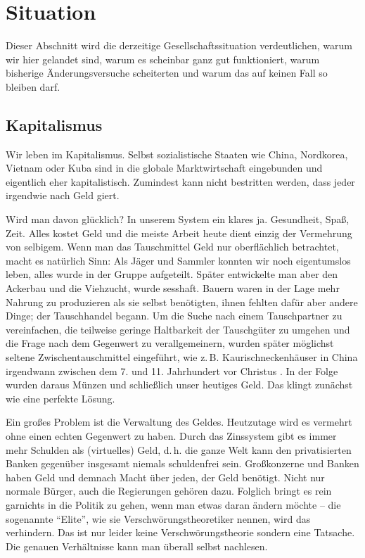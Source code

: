 \section{Situation}\label{sec:situation}

Dieser Abschnitt wird die derzeitige Gesellschaftssituation verdeutlichen, warum wir hier gelandet sind, warum es scheinbar ganz gut funktioniert, warum bisherige Änderungsversuche scheiterten und warum das auf keinen Fall so bleiben darf.

\subsection{Kapitalismus}\label{sec:situation/capitalism}

Wir leben im Kapitalismus. Selbst sozialistische Staaten wie China, Nordkorea, Vietnam oder Kuba sind in die globale Marktwirtschaft eingebunden und eigentlich eher kapitalistisch. Zumindest kann nicht bestritten werden, dass jeder irgendwie nach Geld giert.

Wird man davon glücklich? In unserem System ein klares ja. Gesundheit, Spaß, Zeit. Alles kostet Geld und die meiste Arbeit heute dient einzig der Vermehrung von selbigem. Wenn man das Tauschmittel Geld nur oberflächlich betrachtet, macht es natürlich Sinn: Als Jäger und Sammler konnten wir noch eigentumslos leben, alles wurde in der Gruppe aufgeteilt. Später entwickelte man aber den Ackerbau und die Viehzucht, wurde sesshaft. Bauern waren in der Lage mehr Nahrung zu produzieren als sie selbst benötigten, ihnen fehlten dafür aber andere Dinge; der Tauschhandel begann. Um die Suche nach einem Tauschpartner zu vereinfachen, die teilweise geringe Haltbarkeit der Tauschgüter zu umgehen und die Frage nach dem Gegenwert zu verallgemeinern, wurden später möglichst seltene Zwischentauschmittel eingeführt, wie z.\,B. Kaurischneckenhäuser in China irgendwann zwischen dem 7. und 11. Jahrhundert vor Christus \citep{yungti_2003}. In der Folge wurden daraus Münzen und schließlich unser heutiges Geld. Das klingt zunächst wie eine perfekte Lösung.

Ein großes Problem ist die Verwaltung des Geldes. Heutzutage wird es vermehrt ohne einen echten Gegenwert zu haben. Durch das Zinssystem gibt es immer mehr Schulden als (virtuelles) Geld, d.\,h. die ganze Welt kann den privatisierten Banken gegenüber insgesamt niemals schuldenfrei sein. Großkonzerne und Banken haben Geld und demnach Macht über jeden, der Geld benötigt. Nicht nur normale Bürger, auch die Regierungen gehören dazu. Folglich bringt es rein garnichts in die Politik zu gehen, wenn man etwas daran ändern möchte -- die sogenannte "`Elite"', wie sie Verschwörungstheoretiker nennen, wird das verhindern. Das ist nur leider keine Verschwörungstheorie sondern eine Tatsache. Die genauen Verhältnisse kann man überall selbst nachlesen.

